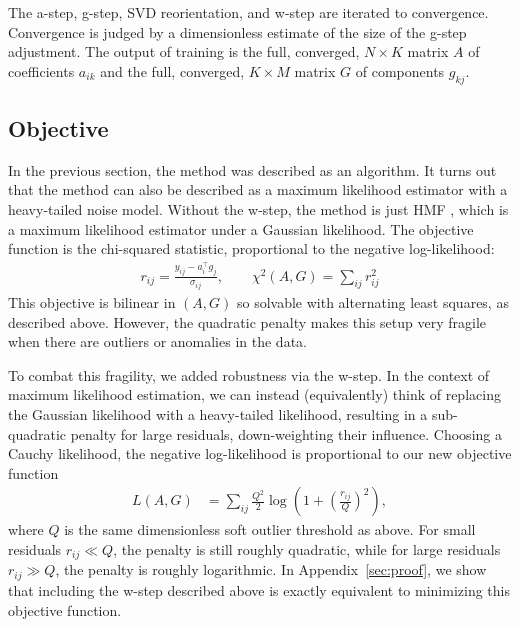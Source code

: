 \documentclass{article}
\begin{document}
The a-step, g-step, SVD reorientation, and w-step are iterated to convergence.
Convergence is judged by a dimensionless estimate of the size of the g-step adjustment.
The output of training is the full, converged, $N\times K$ matrix $A$ of coefficients $a_{ik}$ and the full, converged, $K\times M$ matrix $G$ of components $g_{kj}$.

\subsection{Objective}

In the previous section, the method was described as an algorithm.
It turns out that the method can also be described as a maximum likelihood estimator with a heavy-tailed noise model.
Without the w-step, the method is just HMF \cite{hmf}, which is a maximum likelihood estimator under a Gaussian likelihood.
The objective function is the chi-squared statistic, proportional to the negative log-likelihood:
\begin{align}
    r_{ij} = \frac{y_{ij} - a_i^\top g_j}{\sigma_{ij}}, \qquad 
    \chi^2(A,G) = \sum_{ij} r_{ij}^2
\end{align}
This objective is bilinear in $(A,G)$ so solvable with alternating least squares, as described above.
However, the quadratic penalty makes this setup very fragile when there are outliers or anomalies in the data.

To combat this fragility, we added robustness via the w-step.
In the context of maximum likelihood estimation, we can instead (equivalently) think of replacing the Gaussian likelihood with a heavy-tailed likelihood, resulting in a sub-quadratic penalty for large residuals, down-weighting their influence.
Choosing a Cauchy likelihood, the negative log-likelihood is proportional to our new objective function
\begin{align}
    L(A,G) &= \sum_{ij} \frac{Q^2}{2} \log\!\left(1 + \left(\frac{r_{ij}}{Q}\right)^2\right),
\end{align}
where $Q$ is the same dimensionless soft outlier threshold as above.
For small residuals $r_{ij}\ll Q$, the penalty is still roughly quadratic, while for large residuals $r_{ij}\gg Q$, the penalty is roughly logarithmic.
In Appendix~\ref{sec:proof}, we show that including the w-step described above is exactly equivalent to minimizing this objective function.
\end{document}
